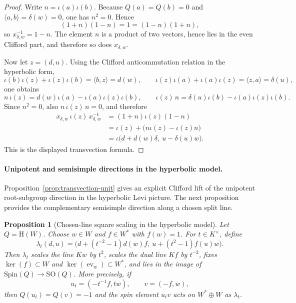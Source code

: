 \documentclass{birkjour}
\theoremstyle{plain}
\newtheorem{proposition}[theorem]{Proposition}
\theoremstyle{definition}
\theoremstyle{remark}
\numberwithin{equation}{section}
\newcommand{\Spin}{\mathrm{Spin}}
\newcommand{\SO}{\mathrm{SO}}
\newcommand{\Hyp}{\mathrm{H}}
\begin{document}
\begin{proof}
Write $n=\iota(a)\iota(b)$. Because $Q(a)=Q(b)=0$ and
$\langle a,b\rangle=\delta(w)=0$, one has $n^2=0$. Hence
\[
  (1+n)(1-n)=1=(1-n)(1+n),
\]
so $x_{\delta,w}^{-1}=1-n$. The element $n$ is a product of two vectors, hence
lies in the even Clifford part, and therefore so does $x_{\delta,w}$.

Now let $z=(d,u)$. Using the Clifford anticommutation relation in the
hyperbolic form,
\[
  \iota(b)\iota(z)+\iota(z)\iota(b)=\langle b,z\rangle=d(w),
  \qquad
  \iota(z)\iota(a)+\iota(a)\iota(z)=\langle z,a\rangle=\delta(u),
\]
one obtains
\[
  n\,\iota(z)=d(w)\iota(a)-\iota(a)\iota(z)\iota(b),
  \qquad
  \iota(z)\,n=\delta(u)\iota(b)-\iota(a)\iota(z)\iota(b).
\]
Since $n^2=0$, also $n\,\iota(z)\,n=0$, and therefore
\[
  \begin{aligned}
  x_{\delta,w}\,\iota(z)\,x_{\delta,w}^{-1}
    &= (1+n)\iota(z)(1-n) \\
    &= \iota(z)+\bigl(n\iota(z)-\iota(z)n\bigr) \\
    &= \iota\bigl(d+d(w)\delta,\ u-\delta(u)w\bigr).
  \end{aligned}
\]
This is the displayed transvection formula.
\end{proof}

\paragraph{Unipotent and semisimple directions in the hyperbolic model.}
Proposition~\ref{prop:transvection-unit} gives an explicit Clifford lift of the
unipotent root-subgroup direction in the hyperbolic Levi picture. The next
proposition provides the complementary semisimple direction along a chosen split
line.

\begin{proposition}[Chosen-line square scaling in the hyperbolic model]
\label{prop:chosen-line-square}
Let $Q=\Hyp(W)$. Choose $w\in W$ and $f\in W^*$ with $f(w)=1$. For
$t\in K^\times$, define
\[
  \lambda_t(d,u)=\bigl(d+(t^{-2}-1)d(w)f,\ u+(t^2-1)f(u)w\bigr).
\]
Then $\lambda_t$ scales the line $Kw$ by $t^2$, scales the dual line $Kf$ by
$t^{-2}$, fixes $\ker(f)\subset W$ and $\ker(\operatorname{ev}_w)\subset W^*$,
and lies in the image of $\Spin(Q)\to \SO(Q)$. More precisely, if
\[
  u_t=(-t^{-1}f,tw),
  \qquad
  v=(-f,w),
\]
then $Q(u_t)=Q(v)=-1$ and the spin element $u_t v$ acts on $W^*\oplus W$ as
$\lambda_t$.
\end{proposition}
\end{document}
